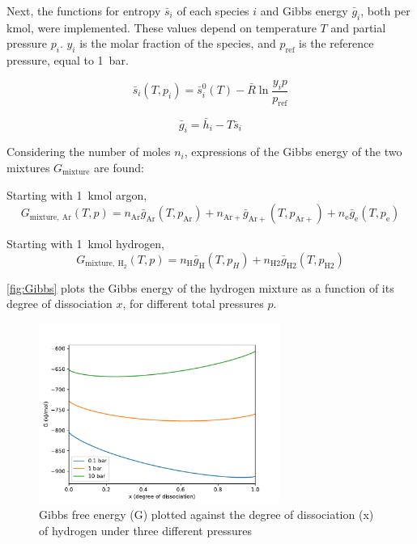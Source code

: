         Next, the functions for entropy $\bar s_i$ of each species $i$ and Gibbs energy $\bar g_i$, both per \unit{kmol}, were implemented. These values depend on temperature $T$ and partial pressure $p_i$. $y_i$ is the molar fraction of the species, and $p_\mathrm{ref}$ is the reference pressure, equal to \qty{1}{bar}.
        
        \begin{equation}
            \bar s_i (T, p_i) = \bar s_i^0 (T) - \bar R \ln \frac{y_i p}{p_\mathrm{ref}}
        \end{equation}

        \begin{equation}
            \bar g_i = \bar h_i - T \bar s_i
        \end{equation}

        Considering the number of moles $n_i$, expressions of the Gibbs energy of the two mixtures $G_\mathrm{mixture}$ are found:

        Starting with \qty{1}{kmol} argon,
        \begin{equation}
            G_\mathrm{mixture,\: Ar}(T, p) = n_\mathrm{Ar} \bar g_\mathrm{Ar}(T, p_\mathrm{Ar}) + n_\mathrm{Ar+} \bar g_\mathrm{Ar+}(T, p_\mathrm{Ar+}) + n_\mathrm{e} \bar g_\mathrm{e}(T, p_\mathrm{e})
        \end{equation}

        Starting with \qty{1}{kmol} hydrogen,
        \begin{equation}
            G_\mathrm{mixture,\: H_2}(T, p) = n_\mathrm{H} \bar g_\mathrm{H}(T, p_H) + n_\mathrm{H2} \bar g_\mathrm{H2}(T, p_\mathrm{H2})
        \end{equation}

        \autoref{fig:Gibbs} plots the Gibbs energy of the hydrogen mixture as a function of its degree of dissociation $x$, for different total pressures $p$.

        \begin{figure}[!ht]
            \centering
            \includegraphics[width=0.7\textwidth]{assets/2 models/Gibbs.pdf}
            \caption{Gibbs free energy (G) plotted against the degree of dissociation (x) of hydrogen under three different pressures}
            \label{fig:Gibbs}
        \end{figure}


